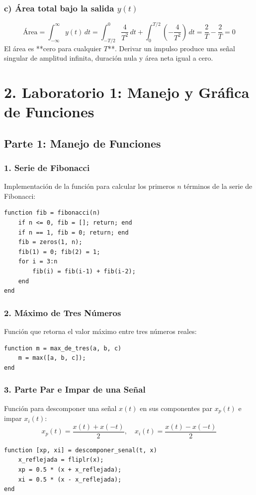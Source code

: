 \documentclass[12pt]{article}
\begin{document}
\subsubsection*{c) Área total bajo la salida $y(t)$}
\[ \text{Área} = \int_{-\infty}^{\infty} y(t) \, dt = \int_{-T/2}^{0} \frac{4}{T^2} \, dt + \int_{0}^{T/2} \left(-\frac{4}{T^2}\right) \, dt = \frac{2}{T} - \frac{2}{T} = 0 \]
El área es **cero para cualquier $T$**. Derivar un impulso produce una señal singular de amplitud infinita, duración nula y área neta igual a cero.

\newpage
\section*{2. Laboratorio 1: Manejo y Gráfica de Funciones}

\subsection*{Parte 1: Manejo de Funciones}

\subsubsection*{1. Serie de Fibonacci}
Implementación de la función para calcular los primeros $n$ términos de la serie de Fibonacci:
\begin{verbatim}
function fib = fibonacci(n)
    if n <= 0, fib = []; return; end
    if n == 1, fib = 0; return; end
    fib = zeros(1, n);
    fib(1) = 0; fib(2) = 1;
    for i = 3:n
        fib(i) = fib(i-1) + fib(i-2);
    end
end
\end{verbatim}

\subsubsection*{2. Máximo de Tres Números}
Función que retorna el valor máximo entre tres números reales:
\begin{verbatim}
function m = max_de_tres(a, b, c)
    m = max([a, b, c]);
end
\end{verbatim}

\subsubsection*{3. Parte Par e Impar de una Señal}
Función para descomponer una señal $x(t)$ en sus componentes par $x_p(t)$ e impar $x_i(t)$:
\[
x_p(t) = \frac{x(t) + x(-t)}{2}, \quad x_i(t) = \frac{x(t) - x(-t)}{2}
\]
\begin{verbatim}
function [xp, xi] = descomponer_senal(t, x)
    x_reflejada = fliplr(x);
    xp = 0.5 * (x + x_reflejada);
    xi = 0.5 * (x - x_reflejada);
end
\end{verbatim}
\end{document}
